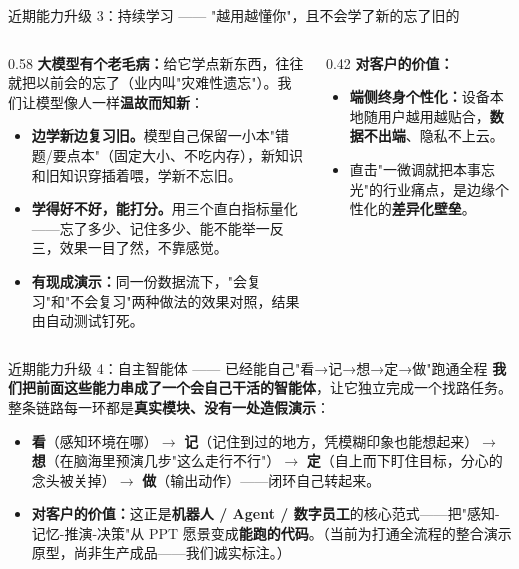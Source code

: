 ﻿\documentclass[aspectratio=169, 10pt]{beamer}
\begin{document}
\begin{frame}{近期能力升级 3：持续学习 —— "越用越懂你"，且不会学了新的忘了旧的}
\small
\begin{columns}
\begin{column}{0.58\textwidth}
\textbf{大模型有个老毛病：}给它学点新东西，往往就把以前会的忘了（业内叫"灾难性遗忘"）。我们让模型像人一样\textbf{温故而知新}：
\begin{itemize}\itemsep=0.3em
    \item \textbf{边学新边复习旧。}模型自己保留一小本"错题/要点本"（固定大小、不吃内存），新知识和旧知识穿插着喂，学新不忘旧。
    \item \textbf{学得好不好，能打分。}用三个直白指标量化——忘了多少、记住多少、能不能举一反三，效果一目了然，不靠感觉。
    \item \textbf{有现成演示：}同一份数据流下，"会复习"和"不会复习"两种做法的效果对照，结果由自动测试钉死。
\end{itemize}
\end{column}
\begin{column}{0.42\textwidth}
\textbf{对客户的价值：}
\begin{itemize}\itemsep=0.3em
    \item \textbf{端侧终身个性化：}设备本地随用户越用越贴合，\textbf{数据不出端}、隐私不上云。
    \item 直击"一微调就把本事忘光"的行业痛点，是边缘个性化的\textbf{差异化壁垒}。
\end{itemize}
\end{column}
\end{columns}
\end{frame}

\begin{frame}{近期能力升级 4：自主智能体 —— 已经能自己"看→记→想→定→做"跑通全程}
\small
\textbf{我们把前面这些能力串成了一个会自己干活的智能体}，让它独立完成一个找路任务。整条链路每一环都是\textbf{真实模块、没有一处造假演示}：
\begin{itemize}\itemsep=0.4em
    \item \textbf{看}（感知环境在哪）$\rightarrow$ \textbf{记}（记住到过的地方，凭模糊印象也能想起来）$\rightarrow$ \textbf{想}（在脑海里预演几步"这么走行不行"）$\rightarrow$ \textbf{定}（自上而下盯住目标，分心的念头被关掉）$\rightarrow$ \textbf{做}（输出动作）——闭环自己转起来。
    \item \textbf{对客户的价值：}这正是\textbf{机器人 / Agent / 数字员工}的核心范式——把"感知-记忆-推演-决策"从 PPT 愿景变成\textbf{能跑的代码}。（当前为打通全流程的整合演示原型，尚非生产成品——我们诚实标注。）
\end{itemize}
\end{frame}
\end{document}
